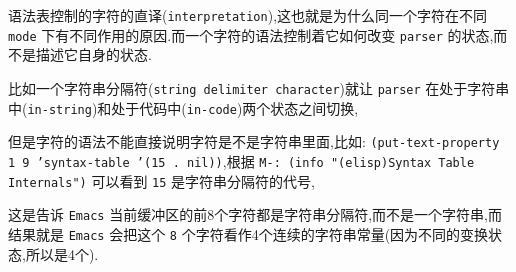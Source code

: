 \documentclass[11pt]{article}
\begin{document}
语法表控制的字符的直译(\texttt{interpretation}),这也就是为什么同一个字符在不同 \texttt{mode} 下有不同作用的原因.而一个字符的语法控制着它如何改变 \texttt{parser} 的状态,而不是描述它自身的状态.

比如一个字符串分隔符(\texttt{string delimiter character})就让 \texttt{parser} 在处于字符串中(\texttt{in-string})和处于代码中(\texttt{in-code})两个状态之间切换,

但是字符的语法不能直接说明字符是不是字符串里面,比如: \texttt{(put-text-property 1 9 'syntax-table '(15 . nil))},根据 \texttt{M-: (info "(elisp)Syntax Table Internals")} 可以看到 \texttt{15} 是字符串分隔符的代号,

这是告诉 \texttt{Emacs} 当前缓冲区的前8个字符都是字符串分隔符,而不是一个字符串,而结果就是 \texttt{Emacs} 会把这个 \texttt{8} 个字符看作4个连续的字符串常量(因为不同的变换状态,所以是4个).
\end{document}
